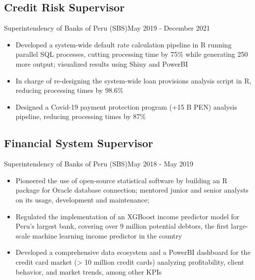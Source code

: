 \subsection{Credit Risk Supervisor}{Superintendency of Banks of Peru (SBS)}{May 2019 - December 2021}
\begin{itemize}
    \item Developed a system-wide default rate calculation pipeline in R running parallel SQL processes, cutting processing time by 75\% while generating 250 more output; visualized results using Shiny and PowerBI
    \item In charge of re-designing the system-wide loan provisions analysis script in R, reducing processing times by 98.6\%
    \item Designed a Covid-19 payment protection program (+15 B PEN) analysis pipeline, reducing processing times by 87\%  
    
    

    

\end{itemize}
\subsection{Financial System Supervisor}{Superintendency of Banks of Peru (SBS)}{May 2018 - May 2019}
\begin{itemize}
    \item Pioneered the use of open-source statistical software by building an R package for Oracle database connection; mentored junior and senior analysts on its usage, development and maintenance;
    \item Regulated the implementation of an XGBoost income predictor model for Peru’s largest bank, covering over 9 million potential debtors, the first large-scale machine learning income predictor in the country
    \item Developed a comprehensive data ecosystem and a PowerBI dashboard for the credit card market (> 10 million credit cards) analyzing profitability, client behavior, and market trends, among other KPIs
    


    
\end{itemize}


